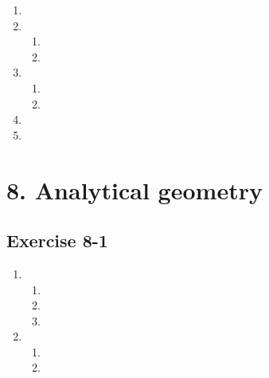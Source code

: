 \begin{enumerate}[itemsep=6pt, label=\textbf{\arabic*}. ]
\item %
\item %
\begin{enumerate}[noitemsep, label=\textbf{(\alph*)} ]
\item %
\item %
\end{enumerate} 
\item %
\begin{enumerate}[noitemsep, label=\textbf{(\alph*)} ] 
\item %
\item %
\end{enumerate} 
\item %
\item %

\end{enumerate}


\section {8. Analytical geometry}
\subsection{Exercise 8-1} %
\begin{enumerate}[label=\textbf{\arabic*}.]
\item %
 \begin{enumerate}[noitemsep, label=\textbf{(\alph*)} ] 
\item %
\item %
\item %
\end{enumerate}

\item %
 \begin{enumerate}[noitemsep, label=\textbf{(\alph*)} ] 
\item %
\item %
\end{enumerate}
\end{enumerate}

